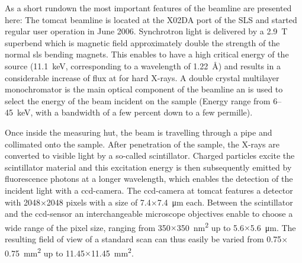 As a short rundown the most important features of the beamline are presented here: The \ac{tomcat} beamline is located at the X02DA port of the SLS and started regular user operation in June 2006. Synchrotron light is delivered by a \SI{2.9}{\tesla} superbend which is magnetic field approximately double the strength of the normal \ac{sls} bending magnets. This enables to have a high critical energy of the source (\SI{11.1}{\kilo\electronvolt}, corresponding to a wavelength of \SI{1.22}{\angstrom}) and results in a considerable increase of flux at for hard X-rays. A double crystal multilayer monochromator is the main optical component of the beamline an is used to select the energy of the beam incident on the sample (Energy range from 6--\SI{45}{\kilo\electronvolt}, with a bandwidth of a few percent down to a few permille).

Once inside the measuring hut, the beam is travelling through a pipe and collimated onto the sample. After penetration of the sample, the X-rays are converted to visible light by a so-called scintillator. Charged particles excite the scintillator material and this excitation energy is then subsequently emitted by fluorescence photons at a longer wavelength, which enables the detection of the incident light with a \ac{ccd}-camera. The \ac{ccd}-camera at \ac{tomcat} features a detector with 2048$\times$2048 pixels with a size of 7.4$\times$\SI{7.4}{\micro\meter} each. Between the scintillator and the \ac{ccd}-sensor an interchangeable microscope objectives enable to choose a wide range of the pixel size, ranging from 350$\times$\SI{350}{\nano\meter\squared} up to 5.6$\times$\SI{5.6}{\micro\meter}. The resulting field of view of a standard scan can thus easily be varied from 0.75$\times$\SI{0.75}{\milli\meter\squared} up to 11.45$\times$\SI{11.45}{\milli\meter\squared}.


